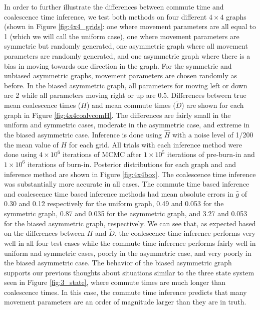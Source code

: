 \documentclass{article}
\newcommand{\Dcom}{\widetilde D}
\begin{document}
In order to further illustrate the differences between commute time and coalescence time inference,
we test both methods on four different $4 \times 4$ graphs (shown in Figure \ref{fig:4x4_grids}:
one where movement parameters are all equal to 1 (which we will call the uniform case),
one where movement parameters are symmetric but randomly generated, 
one asymmetric graph where all movement parameters are randomly generated,
and one asymmetric graph where there is a bias in moving towards one direction in the graph.
For the symmetric and unbiased asymmetric graphs, movement parameters are chosen randomly as before.
In the biased asymmetric graph, all parameters for moving left or down are 2 while 
all parameters moving right or up are 0.5.
Differences between true mean coalescence times ($H$) and mean commute times ($\Dcom$) 
are shown for each graph in Figure \ref{fig:4x4coalvcomH}. 
The differences are fairly small in the uniform and symmetric cases, moderate in the asymmetric case, 
and extreme in the biased asymmetric case.
Inference is done using $\hat{H}$ with a noise level of 1/200 the mean value of $H$ for each grid.
All trials with each inference method were done using $4 \times 10^6$ iterations of MCMC 
after $1 \times 10^5$  iterations of pre-burn-in and $1 \times 10^6$ iterations of burn-in.
Posterior distributions for each graph and and inference method are shown in Figure \ref{fig:4x4box}.
The coalescence time inference was substantially more accurate in all cases.
The commute time based inference and coalescence time based inference methods had 
mean absolute errors in $\hat{g}$ of 0.30 and 0.12 respectively for the uniform graph,
0.49 and 0.053 for the symmetric graph, 
0.87 and 0.035 for the asymmetric graph,
and 3.27 and 0.053 for the biased asymmetric graph, respectively.
We can see that, as expected based on the differences between $H$ and $\Dcom$,
the coalescence time inference performs very well in all four test cases
while the commute time inference performs fairly well in uniform and symmetric cases,
poorly in the asymmetric case, and very poorly in the biased asymmetric case.
The behavior of the biased asymmetric graph supports our previous thoughts about
situations similar to the three state system seen in Figure \ref{fig:3_state},
where commute times are much longer than coalescence times.
In this case, the commute time inference predicts that many movement parameters
are an order of magnitude larger than they are in truth. 
\end{document}
